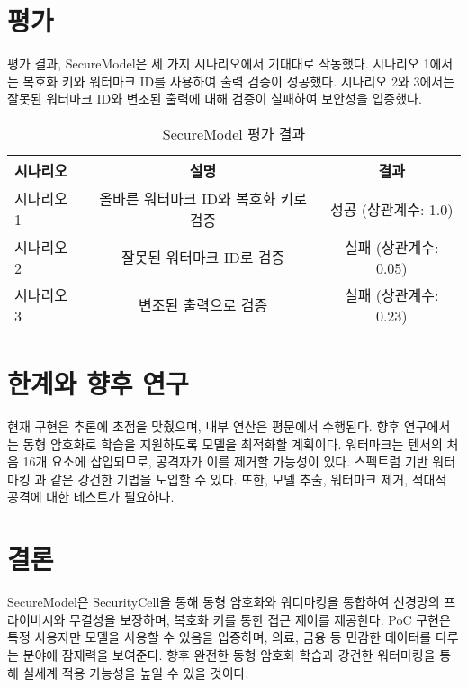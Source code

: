 \documentclass[11pt]{article}
\begin{document}
\section{평가}
평가 결과, SecureModel은 세 가지 시나리오에서 기대대로 작동했다. 시나리오 1에서는 복호화 키와 워터마크 ID를 사용하여 출력 검증이 성공했다. 시나리오 2와 3에서는 잘못된 워터마크 ID와 변조된 출력에 대해 검증이 실패하여 보안성을 입증했다.

\begin{table}[h]
\centering
\caption{SecureModel 평가 결과}
\begin{tabular}{|l|c|c|}
\hline
\textbf{시나리오} & \textbf{설명} & \textbf{결과} \\
\hline
시나리오 1 & 올바른 워터마크 ID와 복호화 키로 검증 & 성공 (상관계수: 1.0) \\
시나리오 2 & 잘못된 워터마크 ID로 검증 & 실패 (상관계수: 0.05) \\
시나리오 3 & 변조된 출력으로 검증 & 실패 (상관계수: 0.23) \\
\hline
\end{tabular}
\end{table}

\section{한계와 향후 연구}
현재 구현은 추론에 초점을 맞췄으며, 내부 연산은 평문에서 수행된다. 향후 연구에서는 동형 암호화로 학습을 지원하도록 모델을 최적화할 계획이다. 워터마크는 텐서의 처음 16개 요소에 삽입되므로, 공격자가 이를 제거할 가능성이 있다. 스펙트럼 기반 워터마킹 \citep{chen2022certified}과 같은 강건한 기법을 도입할 수 있다. 또한, 모델 추출, 워터마크 제거, 적대적 공격에 대한 테스트가 필요하다.

\section{결론}
SecureModel은 SecurityCell을 통해 동형 암호화와 워터마킹을 통합하여 신경망의 프라이버시와 무결성을 보장하며, 복호화 키를 통한 접근 제어를 제공한다. PoC 구현은 특정 사용자만 모델을 사용할 수 있음을 입증하며, 의료, 금융 등 민감한 데이터를 다루는 분야에 잠재력을 보여준다. 향후 완전한 동형 암호화 학습과 강건한 워터마킹을 통해 실세계 적용 가능성을 높일 수 있을 것이다.



\end{document}
